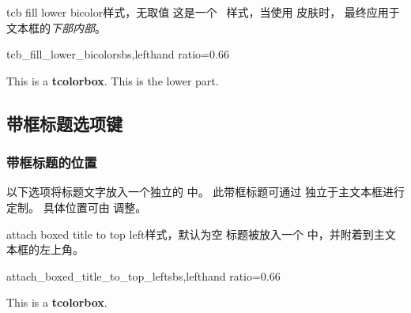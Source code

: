 \clearpage

\begin{docTikzKey}[][doc new=2025-07-07]{tcb fill lower bicolor}{}{样式，无取值}
这是一个 \tikzname\ 样式，当使用  皮肤时，
最终应用于文本框的\emph{下部内部}。

\begin{exdispExample*}{tcb_fill_lower_bicolor}{sbs,lefthand ratio=0.66}

\begin{tcolorbox}[title=My title]
This is a \textbf{tcolorbox}.
\tcblower
This is the lower part.
\end{tcolorbox}
\end{exdispExample*}
\end{docTikzKey}



\clearpage
\subsection{带框标题选项键}\label{subsec:skinboxedtitle}

\subsubsection{带框标题的位置}
以下选项将标题文字放入一个独立的  中。
此带框标题可通过  独立于主文本框进行定制。
具体位置可由  调整。

\begin{docTcbKey}{attach boxed title to top left}{}{样式，默认为空}
标题被放入一个  中，并附着到主文本框的左上角。
\begin{exdispExample*}{attach_boxed_title_to_top_left}{sbs,lefthand ratio=0.66}
\begin{tcolorbox}[enhanced,title=My title,
  attach boxed title to top left]
  This is a \textbf{tcolorbox}.
\end{tcolorbox}
\end{exdispExample*}
\end{docTcbKey}

